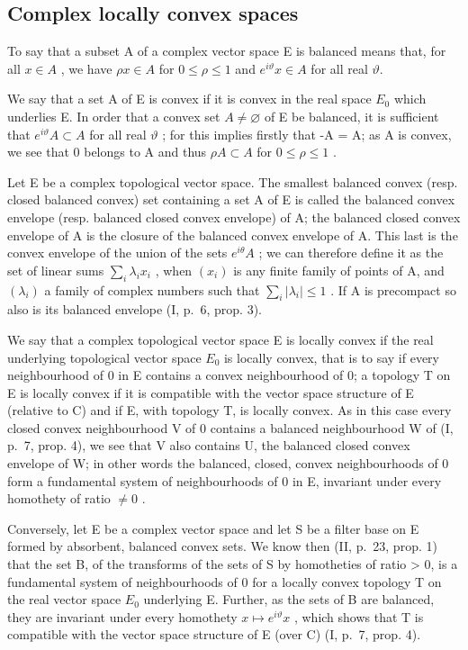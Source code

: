\subsection{Complex locally convex spaces}

To say that a subset A of a complex vector space E is balanced means that, for all \(x \in A\) , we have \(\rho x \in A\) for \(0 \leqslant \rho \leqslant 1\) and \(e^{i\vartheta}x \in A\) for all real \(\vartheta\).

We say that a set A of E is convex if it is convex in the real space \(E_{0}\) which underlies E. In order that a convex set \(A \neq \varnothing\) of E be balanced, it is sufficient that \(e^{i\vartheta}A \subset A\) for all real \(\vartheta\) ; for this implies firstly that -A = A; as A is convex, we see that 0 belongs to A and thus \(\rho A \subset A\) for \(0 \leqslant \rho \leqslant 1\) .

Let E be a complex topological vector space. The smallest balanced convex (resp. closed balanced convex) set containing a set A of E is called the balanced convex envelope (resp. balanced closed convex envelope) of A; the balanced closed convex envelope of A is the closure of the balanced convex envelope of A. This last is the convex envelope of the union of the sets \(e^{i\theta}A\) ; we can therefore define it as the set of linear sums \(\sum_{i}\lambda_{i}x_{i}\) , when \((x_{i})\) is any finite family of points of A, and \((\lambda_{i})\) a family of complex numbers such that \(\sum_{i}|\lambda_{i}| \leqslant 1\) . If A is precompact so also is its balanced envelope (I, p.~6, prop. 3).

We say that a complex topological vector space E is locally convex if the real underlying topological vector space \(E_{0}\) is locally convex, that is to say if every neighbourhood of 0 in E contains a convex neighbourhood of 0; a topology T on E is locally convex if it is compatible with the vector space structure of E (relative to C) and if E, with topology T, is locally convex. As in this case every closed convex neighbourhood V of 0 contains a balanced neighbourhood W of (I, p.~7, prop. 4), we see that V also contains U, the balanced closed convex envelope of W; in other words the balanced, closed, convex neighbourhoods of 0 form a fundamental system of neighbourhoods of 0 in E, invariant under every homothety of ratio \(\neq 0\) .

Conversely, let E be a complex vector space and let S be a filter base on E formed by absorbent, balanced convex sets. We know then (II, p.~23, prop. 1) that the set B, of the transforms of the sets of S by homotheties of ratio \textgreater{} 0, is a fundamental system of neighbourhoods of 0 for a locally convex topology T on the real vector space \(E_{0}\) underlying E. Further, as the sets of B are balanced, they are invariant under every homothety \(x \mapsto e^{i\vartheta}x\) , which shows that T is compatible with the vector space structure of E (over C) (I, p.~7, prop. 4).

